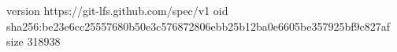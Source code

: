 version https://git-lfs.github.com/spec/v1
oid sha256:be23e6cc25557680b50e3c576872806ebb25b12ba0e6605be357925bf9c827af
size 318938
